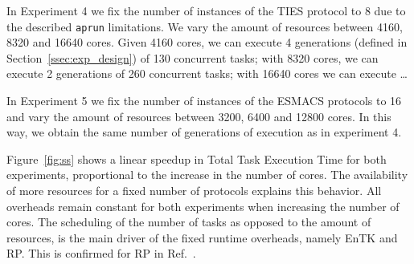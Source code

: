 In Experiment 4 we fix the number of instances of the TIES protocol to 8 due
to the described \texttt{aprun} limitations. We vary the amount of resources
between 4160, 8320 and 16640 cores. Given 4160 cores, we can execute 4
generations (defined in Section~\ref{ssec:exp_design}) of 130 concurrent
tasks; with 8320 cores, we can execute 2 generations of 260 concurrent tasks;
with 16640 cores we can execute \ldots{}

In Experiment 5 we fix the number of instances of the ESMACS protocols to 16
and vary the amount of resources between 3200, 6400 and 12800 cores. In this
way, we obtain the same number of generations of execution as in experiment
4. 

Figure~\ref{fig:ss} shows a linear speedup in Total Task Execution Time for
both experiments, proportional to the increase in the number of cores. The
availability of more resources for a fixed number of protocols explains this
behavior. All overheads remain constant for both experiments when increasing
the number of cores. The scheduling of the number of tasks as opposed to the
amount of resources, is the main driver of the fixed runtime overheads,
namely EnTK and RP. This is confirmed for RP in Ref.~\cite{merzky2018}.


